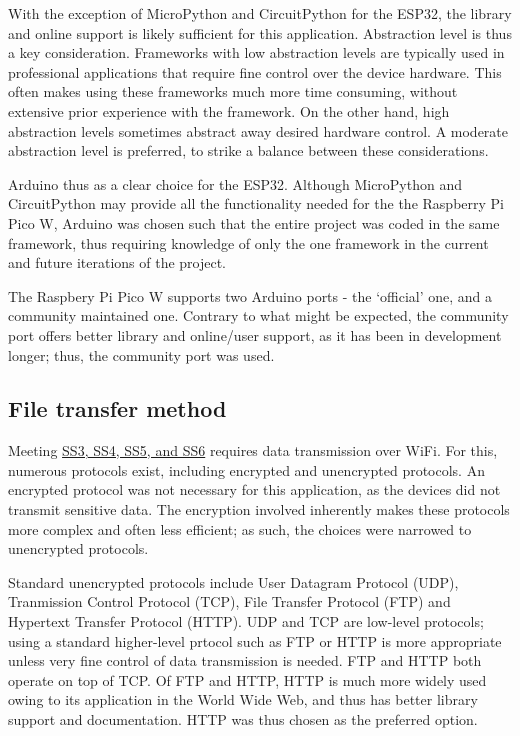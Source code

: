 \documentclass[class=report,11pt,crop=false]{standalone}
\begin{document}
With the exception of MicroPython and CircuitPython for the ESP32, the library and online support is likely sufficient for this application. Abstraction level is thus a key consideration. Frameworks with low abstraction levels are typically used in professional applications that require fine control over the device hardware. This often makes using these frameworks much more time consuming, without extensive prior experience with the framework. On the other hand, high abstraction levels sometimes abstract away desired hardware control. A moderate abstraction level is preferred, to strike a balance between these considerations.

Arduino thus as a clear choice for the ESP32. Although MicroPython and CircuitPython may provide all the functionality needed for the the Raspberry Pi Pico W, Arduino was chosen such that the entire project was coded in the same framework, thus requiring knowledge of only the one framework in the current and future iterations of the project.

The Raspbery Pi Pico W supports two Arduino ports - the `official' one, and a community maintained one. Contrary to what might be expected, the community port offers better library and online/user support, as it has been in development longer; thus, the community port was used.

\subsection{File transfer method}

Meeting \hyperlink{tab:firmware-requirements}{SS3, SS4, SS5, and SS6} requires data transmission over WiFi. For this, numerous protocols exist, including encrypted and unencrypted protocols. An encrypted protocol was not necessary for this application, as the devices did not transmit sensitive data. The encryption involved inherently makes these protocols more complex and often less efficient; as such, the choices were narrowed to unencrypted protocols.

Standard unencrypted protocols include User Datagram Protocol (UDP), Tranmission Control Protocol (TCP), File Transfer Protocol (FTP) and Hypertext Transfer Protocol (HTTP). UDP and TCP are low-level protocols; using a standard higher-level prtocol such as FTP or HTTP is more appropriate unless very fine control of data transmission is needed. FTP and HTTP both operate on top of TCP. Of FTP and HTTP, HTTP is much more widely used owing to its application in the World Wide Web, and thus has better library support and documentation. HTTP was thus chosen as the preferred option.
\end{document}

